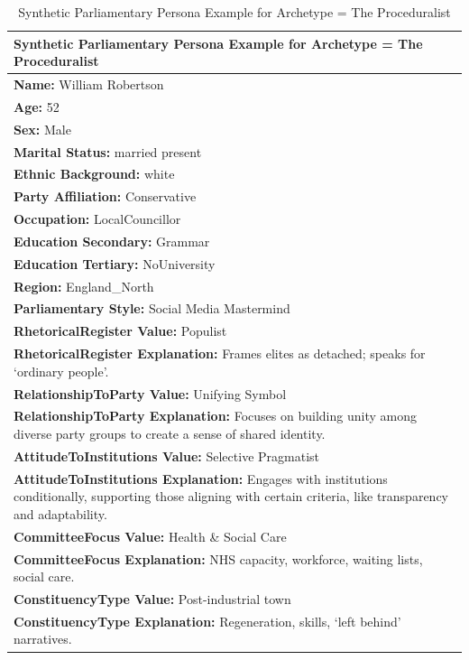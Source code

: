 \documentclass[11pt]{article}
\begin{document}
\begin{table}[ht]
\centering
\caption{Synthetic Parliamentary Persona Example for Archetype = The Proceduralist}
\label{tab:parliamentry-persona-example-1}
\scriptsize %
\begin{tabularx}{\textwidth}{X}
\toprule
\textbf{Synthetic Parliamentary Persona Example for Archetype = The Proceduralist} \\
\midrule
\textbf{Name:} William Robertson \\
\textbf{Age:} 52 \\
\textbf{Sex:} Male \\
\textbf{Marital Status:} married present \\
\textbf{Ethnic Background:} white \\
\textbf{Party Affiliation:} Conservative \\
\textbf{Occupation:} LocalCouncillor \\
\textbf{Education Secondary:} Grammar \\
\textbf{Education Tertiary:} NoUniversity \\
\textbf{Region:} England\_North \\
\textbf{Parliamentary Style:} Social Media Mastermind \\[4pt]

\textbf{RhetoricalRegister Value:} Populist \\
\textbf{RhetoricalRegister Explanation:} Frames elites as detached; speaks for ‘ordinary people’. \\[4pt]

\textbf{RelationshipToParty Value:} Unifying Symbol \\
\textbf{RelationshipToParty Explanation:} Focuses on building unity among diverse party groups to create a sense of shared identity. \\[4pt]

\textbf{AttitudeToInstitutions Value:} Selective Pragmatist \\
\textbf{AttitudeToInstitutions Explanation:} Engages with institutions conditionally, supporting those aligning with certain criteria, like transparency and adaptability. \\[4pt]

\textbf{CommitteeFocus Value:} Health \& Social Care \\
\textbf{CommitteeFocus Explanation:} NHS capacity, workforce, waiting lists, social care. \\[4pt]

\textbf{ConstituencyType Value:} Post-industrial town \\
\textbf{ConstituencyType Explanation:} Regeneration, skills, ‘left behind’ narratives. \\[4pt]


\end{tabularx}
\end{table}
\end{document}
